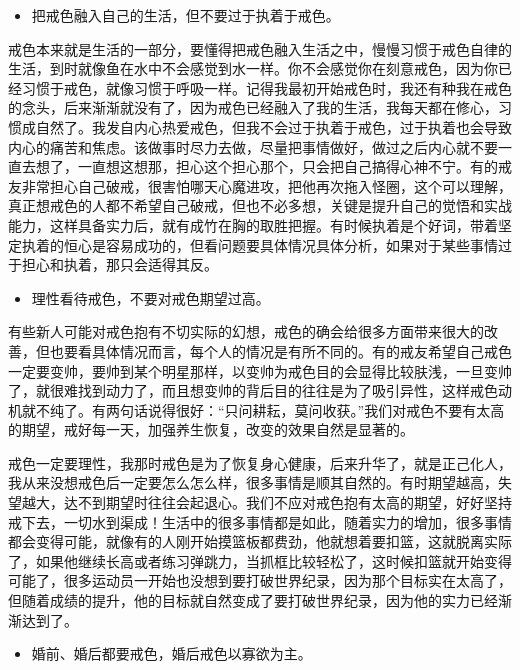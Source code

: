 \begin{itemize}
    \item 把戒色融入自己的生活，但不要过于执着于戒色。
\end{itemize}

戒色本来就是生活的一部分，要懂得把戒色融入生活之中，慢慢习惯于戒色自律的生活，到时就像鱼在水中不会感觉到水一样。你不会感觉你在刻意戒色，因为你已经习惯于戒色，就像习惯于呼吸一样。记得我最初开始戒色时，我还有种我在戒色的念头，后来渐渐就没有了，因为戒色已经融入了我的生活，我每天都在修心，习惯成自然了。我发自内心热爱戒色，但我不会过于执着于戒色，过于执着也会导致内心的痛苦和焦虑。该做事时尽力去做，尽量把事情做好，做过之后内心就不要一直去想了，一直想这想那，担心这个担心那个，只会把自己搞得心神不宁。有的戒友非常担心自己破戒，很害怕哪天心魔进攻，把他再次拖入怪圈，这个可以理解，真正想戒色的人都不希望自己破戒，但也不必多想，关键是提升自己的觉悟和实战能力，这样具备实力后，就有成竹在胸的取胜把握。有时候执着是个好词，带着坚定执着的恒心是容易成功的，但看问题要具体情况具体分析，如果对于某些事情过于担心和执着，那只会适得其反。

\begin{itemize}
    \item 理性看待戒色，不要对戒色期望过高。
\end{itemize}

有些新人可能对戒色抱有不切实际的幻想，戒色的确会给很多方面带来很大的改善，但也要看具体情况而言，每个人的情况是有所不同的。有的戒友希望自己戒色一定要变帅，要帅到某个明星那样，以变帅为戒色目的会显得比较肤浅，一旦变帅了，就很难找到动力了，而且想变帅的背后目的往往是为了吸引异性，这样戒色动机就不纯了。有两句话说得很好：“只问耕耘，莫问收获。”我们对戒色不要有太高的期望，戒好每一天，加强养生恢复，改变的效果自然是显著的。

戒色一定要理性，我那时戒色是为了恢复身心健康，后来升华了，就是正己化人，我从来没想戒色后一定要怎么怎么样，很多事情是顺其自然的。有时期望越高，失望越大，达不到期望时往往会起退心。我们不应对戒色抱有太高的期望，好好坚持戒下去，一切水到渠成！生活中的很多事情都是如此，随着实力的增加，很多事情都会变得可能，就像有的人刚开始摸篮板都费劲，他就想着要扣篮，这就脱离实际了，如果他继续长高或者练习弹跳力，当抓框比较轻松了，这时候扣篮就开始变得可能了，很多运动员一开始也没想到要打破世界纪录，因为那个目标实在太高了，但随着成绩的提升，他的目标就自然变成了要打破世界纪录，因为他的实力已经渐渐达到了。

\begin{itemize}
    \item 婚前、婚后都要戒色，婚后戒色以寡欲为主。
\end{itemize}

